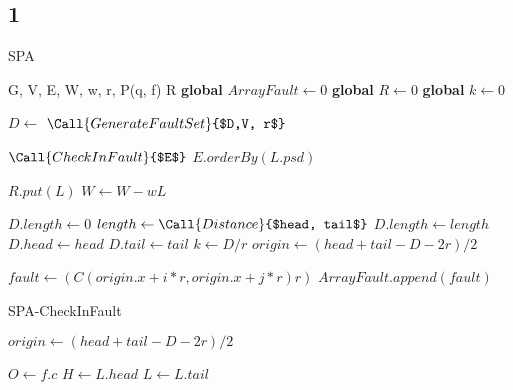 \documentclass[journal]{IEEEtran}
\begin{document}
\newpage
\begin{appendix}  
\section{1}  
\begin{algorithm}
        \caption{SPA}
        \begin{algorithmic}[1] %
            \Require G, V, E, W, w, r, P(q, f)
            \Ensure R
            \State \textbf{global} $ArrayFault\gets 0$
             \State \textbf{global} $R\gets 0$
            \State \textbf{global} $k\gets 0$
              
                \State $D\gets $
                \State $\Call {GenerateFaultSet}{$D,V, r$} $

	        \State $\Call{CheckInFault}{$E$} $
		\State $E.orderBy(L.psd)$

			\State $R .put(L)$
			\State $W \gets W - wL$
		\EndIf
\EndFor 
                 \State {}
            \EndFunction
            
            
            
            
           	 \State $D.length\gets 0$
				 \State $length \gets \Call{Distance}{$head, tail$}$
				 	\State $D.length \gets length$
				  	\State $D.head \gets head$
				 	 \State $D.tail \gets tail$
				\EndIf
			\EndFor 
		\EndFor 
		 \State $k\gets D/r$     
		 \State {}      
            \EndFunction
            	\State $origin \gets (head + tail - D - 2r) / 2 $
		
				 \State $fault \gets (C(origin.x + i * r, origin.x + j * r) r)$
				\State $ArrayFault.append(fault)$
			\EndFor 
		\EndFor   
            \EndFunction
                    \end{algorithmic}
    \end{algorithm}
          \begin{algorithm}
        \caption{SPA-CheckInFault}
        \begin{algorithmic}[1] %
            	\State $origin \gets (head + tail - D - 2r) / 2 $
		
				\State $O \gets f.c $
				\State $H \gets L.head $
				\State $L \gets L.tail $
				

\end{algorithmic}
\end{algorithm}
\end{appendix}
\end{document}
